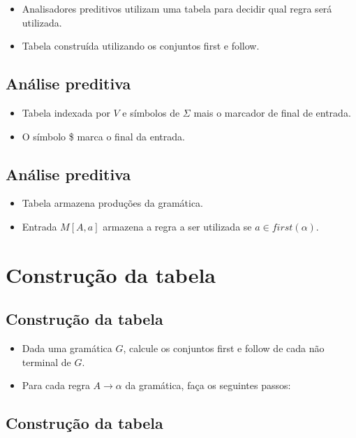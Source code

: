 \documentclass[11pt]{article}
\begin{document}
\begin{itemize}
\item Analisadores preditivos utilizam uma tabela para decidir qual
regra será utilizada.

\item Tabela construída utilizando os conjuntos first e follow.
\end{itemize}
\subsection*{Análise preditiva}
\label{sec:org862ddf9}

\begin{itemize}
\item Tabela indexada por \(V\) e símbolos de \(\Sigma\) mais o marcador de final de entrada.

\item O símbolo \$ marca o final da entrada.
\end{itemize}
\subsection*{Análise preditiva}
\label{sec:org91f1f7e}

\begin{itemize}
\item Tabela armazena produções da gramática.

\item Entrada \(M[A,a]\) armazena a regra a ser utilizada se \(a\in first(\alpha)\).
\end{itemize}
\section*{Construção da tabela}
\label{sec:org45bc98d}

\subsection*{Construção da tabela}
\label{sec:orgc4bd454}

\begin{itemize}
\item Dada uma gramática \(G\), calcule os conjuntos first e follow de cada não terminal de \(G\).

\item Para cada regra \(A \to \alpha\) da gramática, faça os seguintes passos:
\end{itemize}
\subsection*{Construção da tabela}
\label{sec:org7bab92e}
\end{document}
